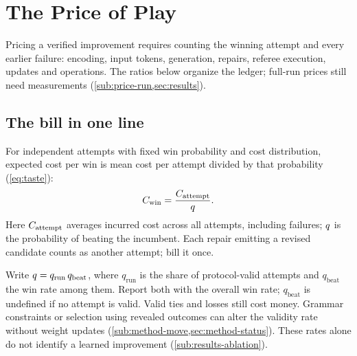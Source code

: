 \section{The Price of Play}\label{sec:price}

Pricing a verified improvement requires counting the winning attempt and
every earlier failure: encoding, input tokens, generation, repairs,
referee execution, updates and operations. The ratios below organize the
ledger; full-run prices still need measurements
(\cref{sub:price-run,sec:results}).

\subsection{The bill in one line}\label{sub:price-bill}

For independent attempts with fixed win probability and cost distribution,
expected cost per win is mean cost per attempt divided by that probability
(\cref{eq:taste}):
\begin{equation}
  C_{\mathrm{win}} = \frac{C_{\mathrm{attempt}}}{q}.
  \label{eq:bill}
\end{equation}
Here $C_{\mathrm{attempt}}$ averages incurred cost across all attempts, including
failures; $q$ is the probability of beating the incumbent. Each
repair emitting a revised candidate counts as another attempt; bill it once.

Write $q = q_{\mathrm{run}}\,q_{\mathrm{beat}}$, where $q_{\mathrm{run}}$
is the share of protocol-valid attempts and $q_{\mathrm{beat}}$ the win rate
among them. Report both with the overall win rate; $q_{\mathrm{beat}}$ is
undefined if no attempt is valid. Valid ties and losses still cost money.
Grammar constraints or selection using revealed outcomes can alter the
validity rate without weight updates (\cref{sub:method-move,sec:method-status}).
These rates alone do not identify a learned improvement
(\cref{sub:results-ablation}).

